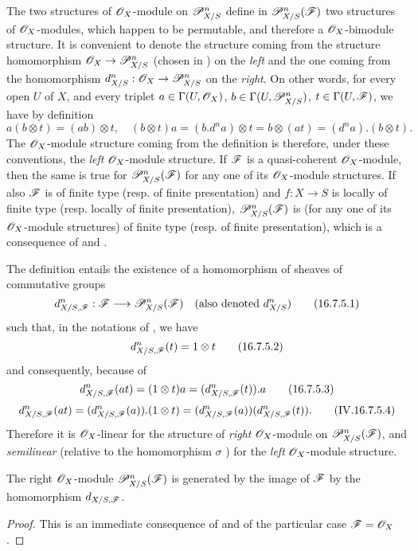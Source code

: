 \begin{env}[16.7.4]
\label{IV.16.7.4}
The two structures of $\mathscr{O}_X$-module on $\mathscr{P}_{X/S}^n$ define in $\mathscr{P}_{X/S}^n(\mathscr{F})$ two structures of $\mathscr{O}_X$-modules, which happen to be permutable, and therefore a $\mathscr{O}_X$-bimodule structure.
It is convenient to denote the structure coming from the structure homomorphism $\sh{O}_X \to \sh{P}_{X/S}^n$ (chosen in ) on the \emph{left} and the one coming from the homomorphism $d_{X/S}^n: \sh{O}_X \to \sh{P}_{X/S}^n$ on the \emph{right}.
On other words, for every open $U$ of $X$, and every triplet $a \in \Gamma(U, \mathscr{O}_X)$, $b \in \Gamma(U, \mathscr{P}_{X/S}^n)$, $t \in \Gamma(U, \mathscr{F})$, we have by definition
\[
  \label{IV.16.7.4.1}
  a(b \otimes t) = (ab) \otimes t, \quad (b \otimes t)a = (b.d^n a) \otimes t = b \otimes (at) = (d^na).(b \otimes t).
  \tag{16.7.4.1}
\]
The $\mathscr{O}_X$-module structure coming from the definition  is therefore, under these conventions, the \emph{left} $\mathscr{O}_X$-module structure.
If $\mathscr{F}$ is a quasi-coherent $\mathscr{O}_X$-module, then the same is true for $\mathscr{P}_{X/S}^n(\mathscr{F})$ for any one of its $\mathscr{O}_X$-module structures.
If also $\mathscr{F}$ is of finite type (resp. of finite presentation) and $f:X \to S$ is locally of finite type (resp. locally of finite presentation), $\mathscr{P}_{X/S}^n(\mathscr{F})$ is (for any one of its $\mathscr{O}_X$-module structures) of finite type (resp. of finite presentation), which is a consequence of  and .
\end{env}

\begin{env}[16.7.5]
\label{IV.16.7.5}
The definition  entails the existence of a homomorphism of sheaves of commutative groups
\[
  \label{IV.16.7.5.1}
  d_{X/S, \sh{F}}^n: \sh{F} \to \sh{P}_{X/S}^n(\sh{F}) \quad (\text{also denoted } d_{X/S}^n)
  \tag{16.7.5.1}
\]
such that, in the notations of , we have
\[
  \label{IV.16.7.5.2}
  d_{X/S, \mathscr{F}}^n(t) = 1 \otimes t
  \tag{16.7.5.2}
\]
and consequently, because of 
\[
  \label{IV.16.7.5.3}
  d_{X/S, \mathscr{F}}^n(at) = (1 \otimes t) a = (d_{X/S, \mathscr{F}}^n(t)).a
  \tag{16.7.5.3}
\]
\[
  \label{IV.IV.16.7.5.4}
  d_{X/S, \mathscr{F}}^n(at) = (d_{X/S, \mathscr{F}}^n(a)).(1 \otimes t) = (d_{X/S, \mathscr{F}}^n(a))(d_{X/S, \mathscr{F}}^n(t)).
  \tag{IV.16.7.5.4}
\]
Therefore it is $\mathscr{O}_X$-linear for the structure of \emph{right} $\mathscr{O}_X$-module on $\mathscr{P}_{X/S}^n(\mathscr{F})$, and \emph{semilinear} (relative to the homomorphism $\sigma$ ) for the \emph{left} $\mathscr{O}_X$-module structure.
\end{env}

\begin{proposition}[16.7.6]
\label{IV.16.7.6}
The right $\mathscr{O}_X$-module $\mathscr{P}_{X/S}^n(\mathscr{F})$ is generated by the image of $\mathscr{F}$ by the homomorphism $d_{X/S, \mathscr{F}}$.
\end{proposition}

\begin{proof}
This is an immediate consequence of  and of the particular case $\mathscr{F} = \mathscr{O}_X$ .
\end{proof}